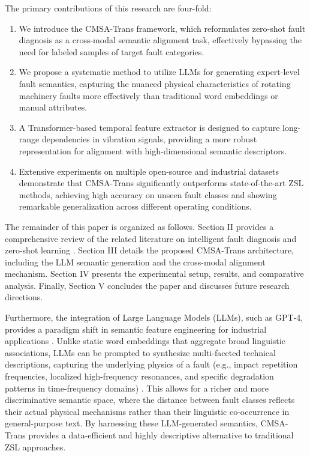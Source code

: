 \documentclass[journal]{IEEEtran}
\begin{document}
The primary contributions of this research are four-fold:
\begin{enumerate}
    \item We introduce the CMSA-Trans framework, which reformulates zero-shot fault diagnosis as a cross-modal semantic alignment task, effectively bypassing the need for labeled samples of target fault categories.
    \item We propose a systematic method to utilize LLMs for generating expert-level fault semantics, capturing the nuanced physical characteristics of rotating machinery faults more effectively than traditional word embeddings or manual attributes.
    \item A Transformer-based temporal feature extractor is designed to capture long-range dependencies in vibration signals, providing a more robust representation for alignment with high-dimensional semantic descriptors.
    \item Extensive experiments on multiple open-source and industrial datasets demonstrate that CMSA-Trans significantly outperforms state-of-the-art ZSL methods, achieving high accuracy on unseen fault classes and showing remarkable generalization across different operating conditions.
\end{enumerate}

The remainder of this paper is organized as follows. Section II provides a comprehensive review of the related literature on intelligent fault diagnosis and zero-shot learning \cite{li2022zero}. Section III details the proposed CMSA-Trans architecture, including the LLM semantic generation and the cross-modal alignment mechanism. Section IV presents the experimental setup, results, and comparative analysis. Finally, Section V concludes the paper and discusses future research directions.

Furthermore, the integration of Large Language Models (LLMs), such as GPT-4, provides a paradigm shift in semantic feature engineering for industrial applications \cite{bubeck2023sparks}. Unlike static word embeddings that aggregate broad linguistic associations, LLMs can be prompted to synthesize multi-faceted technical descriptions, capturing the underlying physics of a fault (e.g., impact repetition frequencies, localized high-frequency resonances, and specific degradation patterns in time-frequency domains) \cite{brown2020language}. This allows for a richer and more discriminative semantic space, where the distance between fault classes reflects their actual physical mechanisms rather than their linguistic co-occurrence in general-purpose text. By harnessing these LLM-generated semantics, CMSA-Trans provides a data-efficient and highly descriptive alternative to traditional ZSL approaches.
\end{document}
